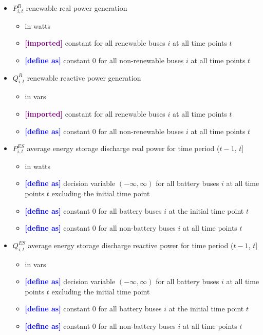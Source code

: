 \documentclass{article}
\newcommand{\define}{\textcolor{blue}{\textbf{[define as] }}}
\newcommand{\imported}{\textcolor{purple}{\textbf{[imported] }}}
\begin{document}
\begin{itemize}
\item $P^R_{i,t}$ renewable real power generation
  \begin{itemize}
  \item in watts
  \item \imported constant for all renewable buses $i$ at all time points $t$
  \item \define constant $0$ for all non-renewable buses $i$ at all time points
    $t$
  \end{itemize}

\item $Q^R_{i,t}$ renewable reactive power generation
  \begin{itemize}
  \item in vars
  \item \imported constant for all renewable buses $i$ at all time points $t$
  \item \define constant $0$ for all non-renewable buses $i$ at all time points
    $t$
  \end{itemize}

\item $P^{ES}_{i,t}$ average energy storage discharge real power for time period
  ($t-1$, $t$]
  \begin{itemize}
  \item in watts
  \item \define decision variable $(-\infty, \infty)$ for all battery buses $i$
    at all time points $t$ excluding the initial time point
  \item \define constant $0$ for all battery buses $i$ at the initial time point
    $t$
  \item \define constant $0$ for all non-battery buses $i$ at all time points
    $t$
  \end{itemize}

\item $Q^{ES}_{i,t}$ average energy storage discharge reactive power for time
  period ($t-1$, $t$]
  \begin{itemize}
  \item in vars
  \item \define decision variable $(-\infty, \infty)$ for all battery buses $i$
    at all time points $t$ excluding the initial time point
  \item \define constant $0$ for all battery buses $i$ at the initial time point
    $t$
  \item \define constant $0$ for all non-battery buses $i$ at all time points
    $t$
  \end{itemize}



\end{itemize}
\end{document}
